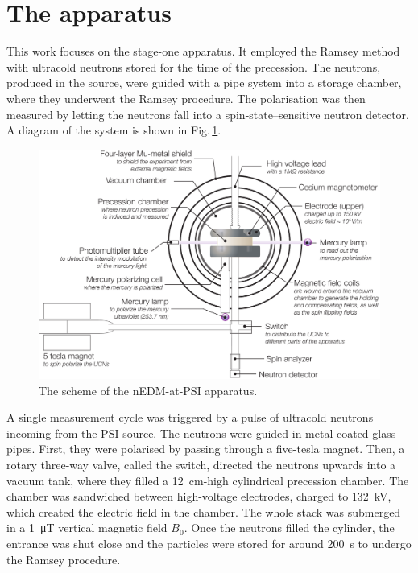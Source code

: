 \section{The apparatus}
This work focuses on the stage-one apparatus. It employed the Ramsey method with ultracold neutrons stored for the time of the precession. The neutrons, produced in the source, were guided with a pipe system into a storage chamber, where they underwent the Ramsey procedure. The polarisation was then measured by letting the neutrons fall into a spin-state--sensitive neutron detector. A diagram of the system is shown in Fig.\,\ref{fig:nEDM_scheme}.

\begin{figure}
  \centering
  \includegraphics[width=\linewidth]{gfx/nEDMatPSI/apparatus-cartoon-main-and-sub-labels.pdf}
  \caption{The scheme of the nEDM-at-PSI apparatus. }
  \label{fig:nEDM_scheme}
\end{figure}

A single measurement cycle was triggered by a pulse of ultracold neutrons incoming from the PSI source. The neutrons were guided in metal-coated glass pipes. First, they were polarised by passing through a five-tesla magnet. Then, a rotary three-way valve, called the switch, directed the neutrons upwards into a vacuum tank, where they filled a \SI{12}{\centi\meter}-high cylindrical precession chamber. The chamber was sandwiched between high-voltage electrodes, charged to \SI{132}{\kilo\volt}, which created the electric field in the chamber. The whole stack was submerged in a \SI{1}{\micro\tesla} vertical magnetic field $B_0$. Once the neutrons filled the cylinder, the entrance was shut close and the particles were stored for around \SI{200}{\second} to undergo the Ramsey procedure.

